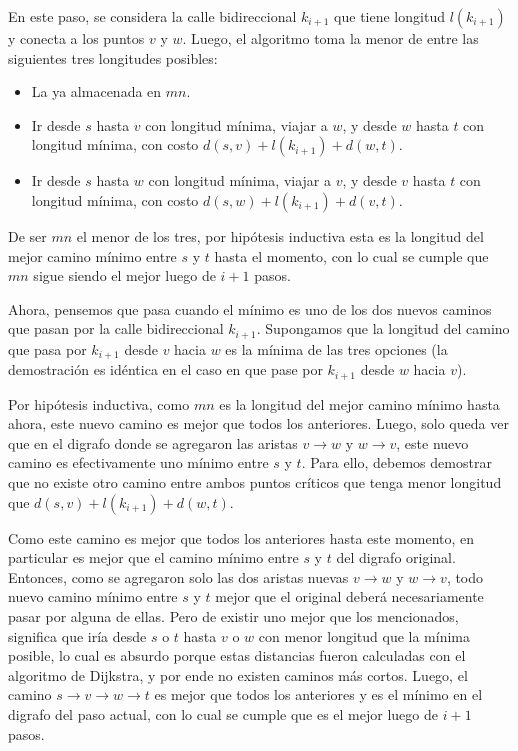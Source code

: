 \vspace{1em}

En este paso, se considera la calle bidireccional $k_{i+1}$ que tiene longitud $l(k_{i+1})$ y conecta a los puntos $v$ y $w$. Luego, el algoritmo toma la menor de entre las siguientes tres longitudes posibles:

\begin{itemize}
        \item La ya almacenada en $mn$.
        \item Ir desde $s$ hasta $v$ con longitud mínima, viajar a $w$, y desde $w$ hasta $t$ con longitud mínima, con costo $d(s,v) + l(k_{i+1}) + d(w,t)$.
        \item Ir desde $s$ hasta $w$ con longitud mínima, viajar a $v$, y desde $v$ hasta $t$ con longitud mínima, con costo $d(s,w) + l(k_{i+1}) + d(v,t)$.
\end{itemize}

De ser $mn$ el menor de los tres, por hipótesis inductiva esta es la longitud del mejor camino mínimo entre $s$ y $t$ hasta el momento, con lo cual se cumple que $mn$ sigue siendo el mejor luego de $i+1$ pasos.

\vspace{1em}

Ahora, pensemos que pasa cuando el mínimo es uno de los dos nuevos caminos que pasan por la calle bidireccional $k_{i+1}$. Supongamos que la longitud del camino que pasa por $k_{i+1}$ desde $v$ hacia $w$ es la mínima de las tres opciones (la demostración es idéntica en el caso en que pase por $k_{i+1}$ desde $w$ hacia $v$). 

\vspace{1em}

Por hipótesis inductiva, como $mn$ es la longitud del mejor camino mínimo hasta ahora, este nuevo camino es mejor que todos los anteriores. Luego, solo queda ver que en el digrafo donde se agregaron las aristas $v \rightarrow w$ y $w \rightarrow v$, este nuevo camino es efectivamente uno mínimo entre $s$ y $t$. Para ello, debemos demostrar que no existe otro camino entre ambos puntos críticos que tenga menor longitud que $d(s,v) + l(k_{i+1}) + d(w,t)$. 

\vspace{1em}

Como este camino es mejor que todos los anteriores hasta este momento, en particular es mejor que el camino mínimo entre $s$ y $t$ del digrafo original. Entonces, como se agregaron solo las dos aristas nuevas $v \rightarrow w$ y $w \rightarrow v$, todo nuevo camino mínimo entre $s$ y $t$ mejor que el original deberá necesariamente pasar por alguna de ellas. Pero de existir uno mejor que los mencionados, significa que iría desde $s$ o $t$ hasta $v$ o $w$ con menor longitud que la mínima posible, lo cual es absurdo porque estas distancias fueron calculadas con el algoritmo de Dijkstra, y por ende no existen caminos más cortos. Luego, el camino $s \rightarrow v \rightarrow w \rightarrow t$ es mejor que todos los anteriores y es el mínimo en el digrafo del paso actual, con lo cual se cumple que es el mejor luego de $i+1$ pasos.

